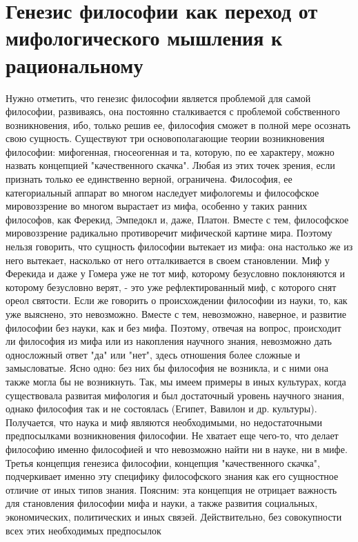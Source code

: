 \documentclass[12pt]{article}
\begin{document}
\section{Генезис философии как переход от мифологического мышления к рациональному}
Нужно отметить, что генезис философии является проблемой для самой философии, развиваясь, она постоянно
сталкивается с проблемой собственного возникновения, ибо, только решив ее, философия сможет в полной мере
осознать свою сущность. 
Существуют  три  основополагающие  теории  возникновения  философии:  мифогенная,  гносеогенная  и  та,
которую, по ее характеру, можно назвать концепцией "качественного скачка". Любая из этих точек зрения, если
признать  только  ее  единственно  верной,  ограничена.  Философия,  ее  категориальный  аппарат  во  многом
наследует мифологемы и философское мировоззрение во многом вырастает из мифа, особенно у таких ранних
философов, как Ферекид, Эмпедокл и, даже, Платон. Вместе с тем, философское мировоззрение радикально
противоречит мифической картине мира. Поэтому нельзя говорить, что сущность философии вытекает из мифа:
она настолько же из него вытекает, насколько от него отталкивается в своем становлении. Миф у Ферекида и
даже у Гомера уже не тот миф, которому безусловно поклоняются и которому безусловно верят, - это уже
рефлектированный миф, с которого снят ореол святости. 
Если же говорить о происхождении философии из науки, то, как уже выяснено, это невозможно. Вместе с тем,
невозможно,  наверное,  и  развитие  философии  без  науки,  как  и  без  мифа.  Поэтому,  отвечая  на  вопрос,
происходит ли философия из мифа или из накопления научного знания, невозможно дать односложный ответ
"да" или "нет", здесь отношения более сложные и замысловатые. Ясно одно: без них бы философия не возникла,
и с ними она также могла бы не возникнуть. Так, мы имеем примеры в иных культурах, когда существовала
развитая  мифология  и  был достаточный  уровень научного знания, однако  философия  так и не  состоялась
(Египет, Вавилон и др. культуры). Получается, что наука и миф являются необходимыми, но недостаточными
предпосылками возникновения философии. Не хватает еще чего-то, что делает философию именно философией
и что невозможно найти ни в науке, ни в мифе. 
Третья концепция генезиса философии, концепция "качественного скачка", подчеркивает именно эту специфику
философского знания как его сущностное отличие от иных типов знания. Поясним: эта концепция не отрицает
важность  для  становления  философии  мифа  и  науки,  а  также  развития  социальных,  экономических,
политических  и  иных  связей.  Действительно,  без  совокупности  всех  этих  необходимых  предпосылок
\end{document}
